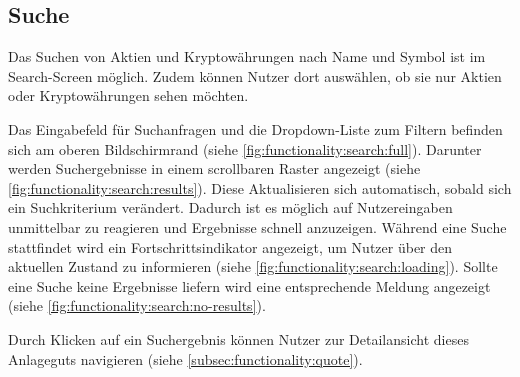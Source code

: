 \documentclass[a4paper]{article}
\begin{document}
\subsection{Suche}
\label{subsec:functionality:search}
Das Suchen von Aktien und Kryptowährungen nach Name und Symbol ist im Search-Screen möglich.
Zudem können Nutzer dort auswählen, ob sie nur Aktien oder Kryptowährungen sehen möchten.

Das Eingabefeld für Suchanfragen und die Dropdown-Liste zum Filtern befinden sich am oberen Bildschirmrand (siehe \autoref{fig:functionality:search:full}).
Darunter werden Suchergebnisse in einem scrollbaren Raster angezeigt (siehe \autoref{fig:functionality:search:results}).
Diese Aktualisieren sich automatisch, sobald sich ein Suchkriterium verändert.
Dadurch ist es möglich auf Nutzereingaben unmittelbar zu reagieren und Ergebnisse schnell anzuzeigen.
Während eine Suche stattfindet wird ein Fortschritts\-indikator angezeigt, um Nutzer über den aktuellen Zustand zu informieren (siehe \autoref{fig:functionality:search:loading}).
Sollte eine Suche keine Ergebnisse liefern wird eine entsprechende Meldung angezeigt (siehe \autoref{fig:functionality:search:no-results}).

Durch Klicken auf ein Suchergebnis können Nutzer zur Detailansicht dieses Anlageguts navigieren (siehe \autoref{subsec:functionality:quote}).
\end{document}
